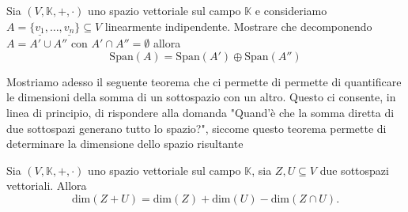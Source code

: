 \begin{exercise}
    \label{ex:1.12}
    Sia $(V, \mathbb{K}, +, \cdot)$ uno spazio vettoriale sul campo $\mathbb{K}$ e consideriamo $A = \{ \underline{v_1}, \ldots, \underline{v_n} \} \subseteq V$ linearmente indipendente. Mostrare che decomponendo $A = A' \cup A''$ con $A' \cap A'' = \emptyset$ allora
    $$
        \text{Span}(A) = \text{Span}(A') \oplus \text{Span}(A'')
    $$
\end{exercise}
Mostriamo adesso il seguente teorema che ci permette di permette di quantificare le dimensioni della somma di un sottospazio con un altro. Questo ci consente, in linea di principio, di rispondere alla domanda "Quand'è che la somma diretta di due sottospazi generano tutto lo spazio?", siccome questo teorema permette di determinare la dimensione dello spazio risultante
\begin{theorem}
    Sia $(V, \mathbb{K}, +, \cdot)$ uno spazio vettoriale sul campo $\mathbb{K}$, sia $Z, U \subseteq V$ due sottospazi vettoriali. Allora
    $$
        \text{dim}(Z + U) = \text{dim}(Z) + \text{dim}(U) - \text{dim}(Z \cap U).
    $$
\end{theorem}
